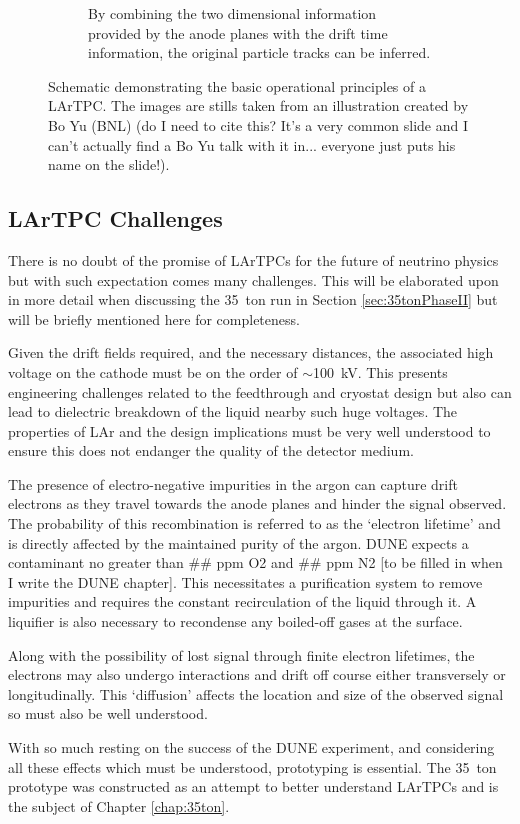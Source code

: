 \begin{figure}[p]
\begin{subfigure}[t]{0.48\linewidth}
    \caption{By combining the two dimensional information provided by the anode planes with the drift time information, the original particle tracks can be inferred.}
    \label{fig:LArTPCOperation4}
  \end{subfigure}
  \caption[Schematic demonstrating the basic operational principles of a LArTPC.]{Schematic demonstrating the basic operational principles of a LArTPC.  The images are stills taken from an illustration created by Bo Yu (BNL) (do I need to cite this?  It's a very common slide and I can't actually find a Bo Yu talk with it in... everyone just puts his name on the slide!).}
  \label{fig:LArTPCOperation}
\end{figure}

\subsection{LArTPC Challenges}\label{sec:LArTPCChallenges}

There is no doubt of the promise of LArTPCs for the future of neutrino physics but with such expectation comes many challenges.  This will be elaborated upon in more detail when discussing the 35~ton run in Section \ref{sec:35tonPhaseII} but will be briefly mentioned here for completeness.

Given the drift fields required, and the necessary distances, the associated high voltage on the cathode must be on the order of $\sim$100~kV.  This presents engineering challenges related to the feedthrough and cryostat design but also can lead to dielectric breakdown of the liquid nearby such huge voltages.  The properties of LAr and the design implications must be very well understood to ensure this does not endanger the quality of the detector medium.

The presence of electro-negative impurities in the argon can capture drift electrons as they travel towards the anode planes and hinder the signal observed.  The probability of this recombination is referred to as the `electron lifetime' and is directly affected by the maintained purity of the argon.  DUNE expects a contaminant no greater than \#\# ppm O2 and \#\# ppm N2 [to be filled in when I write the DUNE chapter].  This necessitates a purification system to remove impurities and requires the constant recirculation of the liquid through it.  A liquifier is also necessary to recondense any boiled-off gases at the surface.

Along with the possibility of lost signal through finite electron lifetimes, the electrons may also undergo interactions and drift off course either transversely or longitudinally.  This `diffusion' affects the location and size of the observed signal so must also be well understood.

With so much resting on the success of the DUNE experiment, and considering all these effects which must be understood, prototyping is essential.  The 35~ton prototype was constructed as an attempt to better understand LArTPCs and is the subject of Chapter \ref{chap:35ton}.

